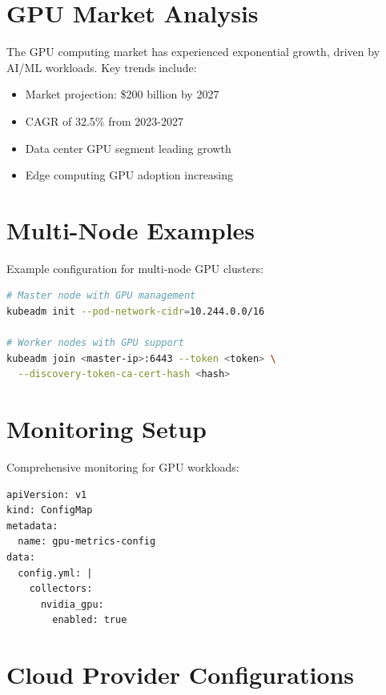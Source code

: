 \documentclass[12pt,a4paper]{report}
\begin{document}
\section{GPU Market Analysis}
\label{sec:gpu-market-analysis}

The GPU computing market has experienced exponential growth, driven by AI/ML workloads. Key trends include:

\begin{itemize}
    \item Market projection: \$200 billion by 2027
    \item CAGR of 32.5\% from 2023-2027
    \item Data center GPU segment leading growth
    \item Edge computing GPU adoption increasing
\end{itemize}

\section{Multi-Node Examples}
\label{sec:multi-node-examples}

Example configuration for multi-node GPU clusters:

\begin{lstlisting}[language=bash,caption=Multi-Node GPU Setup,label=lst:multi-node]
# Master node with GPU management
kubeadm init --pod-network-cidr=10.244.0.0/16

# Worker nodes with GPU support
kubeadm join <master-ip>:6443 --token <token> \
  --discovery-token-ca-cert-hash <hash>
\end{lstlisting}

\section{Monitoring Setup}
\label{sec:monitoring-setup}

Comprehensive monitoring for GPU workloads:

\begin{lstlisting}[caption=GPU Monitoring Configuration,label=lst:monitoring]
apiVersion: v1
kind: ConfigMap
metadata:
  name: gpu-metrics-config
data:
  config.yml: |
    collectors:
      nvidia_gpu:
        enabled: true
\end{lstlisting}

\section{Cloud Provider Configurations}
\label{sec:cloud-configs}
\end{document}
